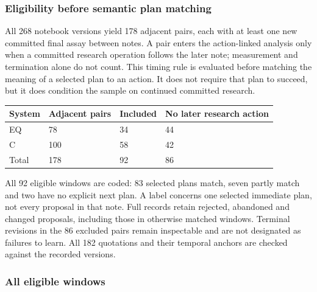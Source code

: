 \documentclass[10pt,a4paper]{article}
\begin{document}
\subsubsection{Eligibility before semantic plan matching}\label{eligibility-before-semantic-plan-matching}

All 268 notebook versions yield 178 adjacent pairs, each with at least one new committed final assay between notes. A pair enters the action-linked analysis only when a committed research operation follows the later note; measurement and termination alone do not count. This timing rule is evaluated before matching the meaning of a selected plan to an action. It does not require that plan to succeed, but it does condition the sample on continued committed research.

{\def\LTcaptype{table} %
\small\begin{longtable}[]{@{}llll@{}}
\toprule\noalign{}
System & Adjacent pairs & Included & No later research action \\
\midrule\noalign{}
\endhead
\bottomrule\noalign{}
\endlastfoot
EQ & 78 & 34 & 44 \\
C & 100 & 58 & 42 \\
Total & 178 & 92 & 86 \\
\end{longtable}\normalsize
}

All 92 eligible windows are coded: 83 selected plans match, seven partly match and two have no explicit next plan. A label concerns one selected immediate plan, not every proposal in that note. Full records retain rejected, abandoned and changed proposals, including those in otherwise matched windows. Terminal revisions in the 86 excluded pairs remain inspectable and are not designated as failures to learn. All 182 quotations and their temporal anchors are checked against the recorded versions.

\subsubsection{All eligible windows}\label{all-eligible-windows}
\end{document}
